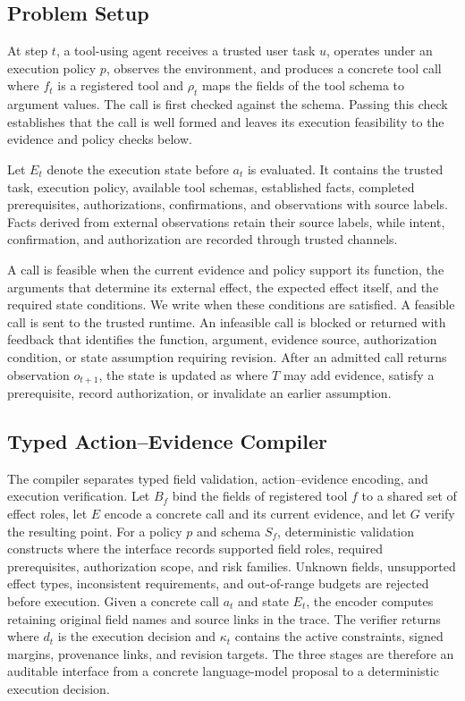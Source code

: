\documentclass[11pt]{article}
\begin{document}
\subsection{Problem Setup}

At step $t$, a tool-using agent receives a trusted user task $u$, operates under an execution policy $p$, observes the environment, and produces a concrete tool call
where $f_t$ is a registered tool and $\rho_t$ maps the fields of the tool schema to argument values. The call is first checked against the schema. Passing this check establishes that the call is well formed and leaves its execution feasibility to the evidence and policy checks below.

Let $E_t$ denote the execution state before $a_t$ is evaluated. It contains the trusted task, execution policy, available tool schemas, established facts, completed prerequisites, authorizations, confirmations, and observations with source labels. Facts derived from external observations retain their source labels, while intent, confirmation, and authorization are recorded through trusted channels.

A call is feasible when the current evidence and policy support its function, the arguments that determine its external effect, the expected effect itself, and the required state conditions. We write
when these conditions are satisfied. A feasible call is sent to the trusted runtime. An infeasible call is blocked or returned with feedback that identifies the function, argument, evidence source, authorization condition, or state assumption requiring revision. After an admitted call returns observation $o_{t+1}$, the state is updated as
where $T$ may add evidence, satisfy a prerequisite, record authorization, or invalidate an earlier assumption.

\subsection{Typed Action--Evidence Compiler}

The compiler separates typed field validation, action--evidence encoding, and execution verification. Let $B_f$ bind the fields of registered tool $f$ to a shared set of effect roles, let $E$ encode a concrete call and its current evidence, and let $G$ verify the resulting point. For a policy $p$ and schema $S_f$, deterministic validation constructs
where the interface records supported field roles, required prerequisites, authorization scope, and risk families. Unknown fields, unsupported effect types, inconsistent requirements, and out-of-range budgets are rejected before execution. Given a concrete call $a_t$ and state $E_t$, the encoder computes
retaining original field names and source links in the trace. The verifier returns
where $d_t$ is the execution decision and $\kappa_t$ contains the active constraints, signed margins, provenance links, and revision targets. The three stages are therefore an auditable interface from a concrete language-model proposal to a deterministic execution decision.
\end{document}
